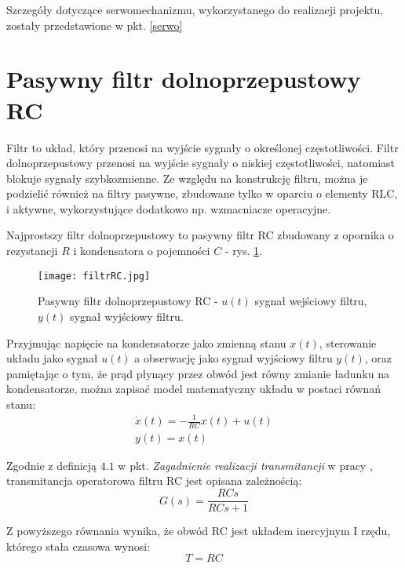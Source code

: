 Szczegóły dotyczące serwomechanizmu, wykorzystanego do realizacji projektu, zostały przedstawione w pkt. \ref{serwo}  
\section{Pasywny filtr dolnoprzepustowy RC}

Filtr to układ, który przenosi na wyjście sygnały o określonej częstotliwości. Filtr dolnoprzepustowy przenosi na wyjście sygnały o niskiej częstotliwości, natomiast blokuje sygnały szybkozmienne. Ze względu na konstrukcję filtru, można je podzielić również na filtry pasywne, zbudowane tylko w oparciu o elementy RLC, i aktywne, wykorzystujące dodatkowo np. wzmacniacze operacyjne. 

Najprostszy filtr dolnoprzepustowy to pasywny filtr RC zbudowany z opornika o rezystancji $R$ i kondensatora o pojemności $C$ - rys. \ref{fig:filtrRC1}. 
\begin{figure}[h]
    \centering
    \texttt{[image: filtrRC.jpg]}
    \caption{Pasywny filtr dolnoprzepustowy RC - $u(t)$ sygnał wejściowy filtru, $y(t)$ sygnał wyjściowy filtru.}
    \label{fig:filtrRC1}
\end{figure}


Przyjmując napięcie na kondensatorze jako zmienną stanu $x(t)$, sterowanie układu jako sygnał $u(t)$ a obserwację jako sygnał wyjściowy filtru $y(t)$, oraz pamiętając o tym, że prąd płynący przez obwód jest równy zmianie ładunku na kondensatorze, można zapisać model matematyczny układu w postaci równań stanu:
\begin{equation}
\begin{gathered}
    \dot{x}(t) = -\frac{1}{RC}x(t) + u(t) \\
    y(t) = x(t)
     \label{eq:stanuRC}
\end{gathered}
\end{equation}

Zgodnie z definicją $4.1$ w pkt. \textit{Zagadnienie realizacji transmitancji} w pracy \cite{graba}, transmitancja operatorowa filtru RC jest opisana zależnością:
\begin{equation}
    G(s) = \frac{RCs}{RCs + 1}
    \label{eq:transRc}
\end{equation}

Z powyższego równania wynika, że obwód RC jest  układem inercyjnym I rzędu, którego stała czasowa wynosi:
\begin{equation}
   T = RC
    \label{eq:stalaCzasowaRC}
\end{equation}

